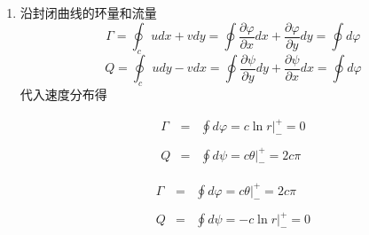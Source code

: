 \begin{solution}
\begin{enumerate}
\item 沿封闭曲线的环量和流量
\[
\Gamma = \oint_c udx + vdy = \oint \frac{\partial \varphi}{\partial x}dx
+ \frac{\partial \varphi}{\partial y}dy = \oint d\varphi
\]
\[
Q=\oint_c udy-vdx=\oint \frac{\partial \psi}{\partial y}dy
+ \frac{\partial \psi}{\partial x}dx = \oint d\varphi
\]
代入速度分布得

\setlength{\columnseprule}{0.4pt}
\begin{multicols}{2}
\setlength{\abovedisplayskip}{-10pt}
\begin{eqnarray}
\Gamma &=& \oint d\varphi = c\ln r\Big|_{-}^{+}= 0\nonumber\\
& &\nonumber\\
Q &=& \oint d\psi=c\theta\Big|_{-}^{+} = 2c\pi\nonumber
\end{eqnarray}

\begin{eqnarray}
\Gamma &=& \oint d\varphi=c\theta\Big|_{-}^{+}=2c\pi\nonumber\\
& &\nonumber\\
Q &=& \oint d\psi = -c\ln r\Big|_{-}^{+}=  0\nonumber
\end{eqnarray}
\end{multicols}
\end{enumerate}
\end{solution} 
